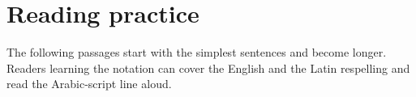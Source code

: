 \section{Reading practice}
The following passages start with the simplest sentences and become longer. Readers learning the notation can cover the English and the Latin respelling and read the Arabic-script line aloud.





